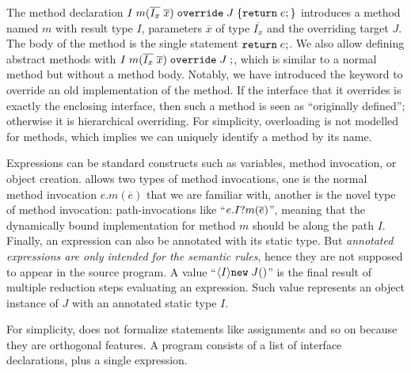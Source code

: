The method declaration $I \; m (\overline{I_x} \; \overline{x}) \; \texttt{override} \; J \; {\{} \texttt{return} \; e ; {\}}$ introduces a
method named $m$ with result type $I$, parameters $\overline{x}$ of
type $\overline{I_x}$ and the overriding target $J$. The body of the
method is the single statement $ \texttt{return} \; e;$. We also allow
defining abstract methods with $I \; m (\overline{I_x} \; \overline{x}) \; \texttt{override} \; J \; ;$, which is
similar to a normal method but without a method body. Notably, we have introduced the
\kwoverride{} keyword to override an old implementation of the
method. If the interface that it overrides is exactly the enclosing
interface, then such a method is seen as ``originally defined''; otherwise
it is hierarchical overriding.
For simplicity, overloading is not modelled for methods, which
implies we can uniquely identify a method by its name.

Expressions can be standard constructs such as variables, method
invocation, or object creation. \name{} allows two types of method invocations, one is the normal method invocation $e.m(\overline{e})$ that we are familiar with, another is the novel type of method invocation: path-invocations like ``$e.I? m(\overline{e})$'', meaning that the dynamically bound
implementation for method $m$ should be along the path $I$. 
Finally, an expression can also be annotated with its static type. But \emph{annotated expressions are only intended for the semantic rules},
hence they are not supposed to appear in the source program. A value
``$\langle I \rangle\texttt{new} \; J()$''
is the final result of multiple reduction steps evaluating an
expression. Such value represents an object instance
of $J$ with an annotated static type $I$.

For simplicity, \name{} does not formalize statements like assignments and so on because they are orthogonal features.
A program consists of a list of interface declarations, plus a single expression.

